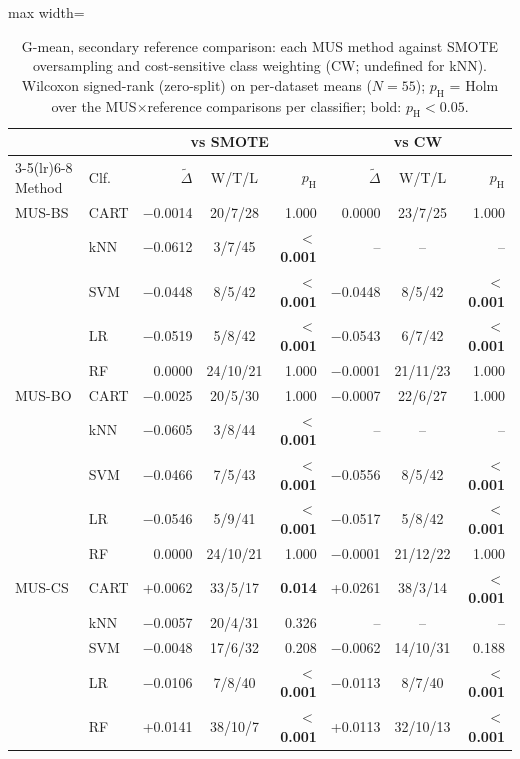 \begin{table}[!htbp]
\centering
\caption{G-mean, secondary reference comparison: each MUS method against SMOTE oversampling and cost-sensitive class weighting (CW; undefined for kNN). Wilcoxon signed-rank (zero-split) on per-dataset means ($N=55$); $p_\mathrm{H}$ = Holm over the MUS$\times$reference comparisons per classifier; bold: $p_\mathrm{H}<0.05$.}
\label{tab:reference_gmean}
\scriptsize
\setlength{\tabcolsep}{3pt}
\begin{adjustbox}{max width=\linewidth}
\begin{tabular}{llrcrrcr}
\toprule
 & & \multicolumn{3}{c}{vs SMOTE} & \multicolumn{3}{c}{vs CW} \\
\cmidrule(lr){3-5}\cmidrule(lr){6-8}
Method & Clf. & $\tilde\Delta$ & W/T/L & $p_\mathrm{H}$ & $\tilde\Delta$ & W/T/L & $p_\mathrm{H}$ \\
\midrule
MUS-BS & CART & $-$0.0014 & 20/7/28 & 1.000 & 0.0000 & 23/7/25 & 1.000 \\
 & kNN & $-$0.0612 & 3/7/45 & \textbf{$<$0.001} & -- & -- & -- \\
 & SVM & $-$0.0448 & 8/5/42 & \textbf{$<$0.001} & $-$0.0448 & 8/5/42 & \textbf{$<$0.001} \\
 & LR & $-$0.0519 & 5/8/42 & \textbf{$<$0.001} & $-$0.0543 & 6/7/42 & \textbf{$<$0.001} \\
 & RF & 0.0000 & 24/10/21 & 1.000 & $-$0.0001 & 21/11/23 & 1.000 \\
\midrule
MUS-BO & CART & $-$0.0025 & 20/5/30 & 1.000 & $-$0.0007 & 22/6/27 & 1.000 \\
 & kNN & $-$0.0605 & 3/8/44 & \textbf{$<$0.001} & -- & -- & -- \\
 & SVM & $-$0.0466 & 7/5/43 & \textbf{$<$0.001} & $-$0.0556 & 8/5/42 & \textbf{$<$0.001} \\
 & LR & $-$0.0546 & 5/9/41 & \textbf{$<$0.001} & $-$0.0517 & 5/8/42 & \textbf{$<$0.001} \\
 & RF & 0.0000 & 24/10/21 & 1.000 & $-$0.0001 & 21/12/22 & 1.000 \\
\midrule
MUS-CS & CART & +0.0062 & 33/5/17 & \textbf{0.014} & +0.0261 & 38/3/14 & \textbf{$<$0.001} \\
 & kNN & $-$0.0057 & 20/4/31 & 0.326 & -- & -- & -- \\
 & SVM & $-$0.0048 & 17/6/32 & 0.208 & $-$0.0062 & 14/10/31 & 0.188 \\
 & LR & $-$0.0106 & 7/8/40 & \textbf{$<$0.001} & $-$0.0113 & 8/7/40 & \textbf{$<$0.001} \\
 & RF & +0.0141 & 38/10/7 & \textbf{$<$0.001} & +0.0113 & 32/10/13 & \textbf{$<$0.001} \\

\end{tabular}
\end{adjustbox}
\end{table}
